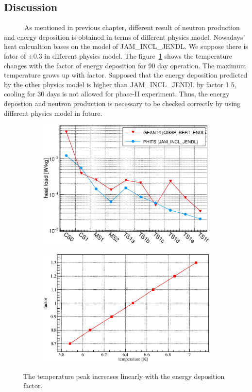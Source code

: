 \subsection{Discussion}
~~~~~~As mentioned in previous chapter, different result of neutron production and energy deposition is obtained in terms of different physics model.
Nowadays' heat calcualtion bases on the model of JAM\_INCL\_JENDL.
We suppose there is fator of $\pm$0.3 in different physics model.
The figure~\ref{5factor} shows the temperature changes with the factor of energy deposition for 90 day operation.
The maximum temperature grows up with factor.
Supposed that the energy deposition predicted by the other physics model is higher than JAM\_INCL\_JENDL by factor 1.5, cooling for 30 days is not allowed for phase-II experiment.
Thus, the energy depostion and neutron production is necessary to be checked correctly by using different physics model in future.
\begin{figure}[H]
 \begin{subfigure}{0.3\textwidth}
 \centering
 \includegraphics[scale=0.45]{chapter5/fig/g4phs.eps}
 \end{subfigure}
 \hspace{0.2\textwidth}
 \begin{subfigure}{0.3\textwidth}
 \centering
 \includegraphics[scale=0.45]{chapter6/fig/factor.eps}
 \end{subfigure}
 \caption{ The temperature peak increases linearly with the energy deposition factor.}
 \label{5factor}
\end{figure}

